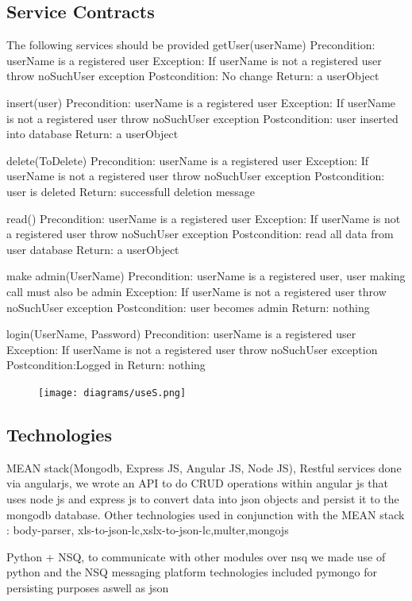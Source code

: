 \documentclass[12pt]{article}
\begin{document}
\subsection{Service Contracts}
The following services should be provided
getUser(userName)
Precondition: userName is a registered user
Exception: If userName is not a registered user throw noSuchUser exception
Postcondition: No change
Return: a userObject

insert(user)
Precondition: userName is a registered user
Exception: If userName is not a registered user throw noSuchUser exception
Postcondition: user inserted into database
Return: a userObject

delete(ToDelete)
Precondition: userName is a registered user
Exception: If userName is not a registered user throw noSuchUser exception
Postcondition: user is deleted
Return: successfull deletion message

read()
Precondition: userName is a registered user
Exception: If userName is not a registered user throw noSuchUser exception
Postcondition: read all data from user database
Return: a userObject

make admin(UserName)
Precondition: userName is a registered user, user making call must also be admin
Exception: If userName is not a registered user throw noSuchUser exception
Postcondition: user becomes admin
Return: nothing

login(UserName, Password)
Precondition: userName is a registered user
Exception: If userName is not a registered user throw noSuchUser exception
Postcondition:Logged in
Return: nothing

\begin{figure}
\centering
\texttt{[image: diagrams/useS.png]}
\end{figure}
\subsection{Technologies}
MEAN stack(Mongodb, Express JS, Angular JS, Node JS), Restful services done via angularjs, we wrote an API to do CRUD operations within angular js that uses node js and express js to convert data into json objects and persist it to the mongodb database. Other technologies used in conjunction with the MEAN stack : body-parser, xls-to-json-lc,xslx-to-json-lc,multer,mongojs

Python + NSQ, to communicate with other modules over nsq we made use of python and the NSQ messaging platform technologies included pymongo for persisting purposes aswell as json
\end{document}
